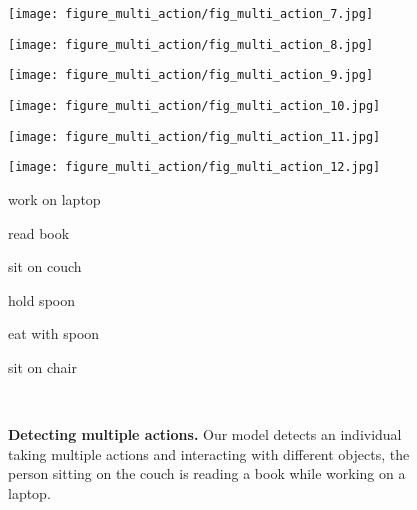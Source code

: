 \documentclass{bmvc2k}
\newlength\figmargin
\newlength\figbmargin
\newcommand{\mpage}[2]
{
\begin{minipage}{#1\linewidth}\centering
#2
\end{minipage}
}
\newcommand{\tb}[1]{\textbf{#1}}
\begin{document}
\begin{figure*}[t]
\mpage{0.155}{\texttt{[image: figure\_multi\_action/fig\_multi\_action\_7.jpg]}}\hfill
\mpage{0.155}{\texttt{[image: figure\_multi\_action/fig\_multi\_action\_8.jpg]}}\hfill
\mpage{0.155}{\texttt{[image: figure\_multi\_action/fig\_multi\_action\_9.jpg]}}\hfill
\mpage{0.155}{\texttt{[image: figure\_multi\_action/fig\_multi\_action\_10.jpg]}}\hfill
\mpage{0.155}{\texttt{[image: figure\_multi\_action/fig\_multi\_action\_11.jpg]}}\hfill
\mpage{0.155}{\texttt{[image: figure\_multi\_action/fig\_multi\_action\_12.jpg]}}

\mpage{0.155}{\scriptsize work on laptop}\hfill
\mpage{0.155}{\scriptsize read book}\hfill
\mpage{0.155}{\scriptsize sit on couch}\hfill
\mpage{0.155}{\scriptsize hold spoon}\hfill
\mpage{0.155}{\scriptsize eat with spoon}\hfill
\mpage{0.155}{\scriptsize sit on chair}\\

\vspace{\figmargin}
\caption{\tb{Detecting multiple actions.} Our model detects an individual taking multiple actions and interacting with different objects, \eg the person sitting on the couch is reading a book while working on a laptop.
}
\vspace{\figbmargin}
\label{fig:multi_action}
\end{figure*}
 
\end{document}
